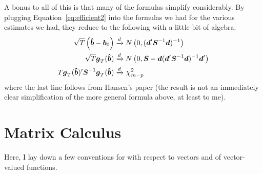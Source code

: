 \documentclass[12pt]{article}
\theoremstyle{plain}
\theoremstyle{definition}
\theoremstyle{remark}
\newcommand*{\Chi}{\mbox{\large$\chi$}} %
\begin{document}
A bonus to all of this is that many of the formulas simplify
considerably. By plugging Equation~\ref{eq:efficient2} into the formulas
we had for the various estimates we had, they reduce to the following
with a little bit of algebra:
\begin{align*}
  \sqrt{T}\left(\boldsymbol{\hat{b}}-\boldsymbol{b}_0\right)
  &\xrightarrow{d}
  N\left(0,
  (\boldsymbol{d}' \boldsymbol{S}^{-1} \boldsymbol{d})^{-1}
  \right)\\
  \sqrt{T}\boldsymbol{g}_T(\boldsymbol{\hat{b}})
  &\xrightarrow{d}
  N\left(
  0,
  \boldsymbol{S}
  -\boldsymbol{d}(\boldsymbol{d}' \boldsymbol{S}^{-1} \boldsymbol{d})^{-1}
  \boldsymbol{d}'
  \right)\\
  T
  \boldsymbol{g}_T(\boldsymbol{\hat{b}})'
  \boldsymbol{S}^{-1}
  \boldsymbol{g}_T(\boldsymbol{\hat{b}})
  &\xrightarrow{d} \Chi^2_{m-p}
\end{align*}
where the last line follows from Hansen's paper (the result is not an
immediately clear simplification of the more general formula above, at
least to me).



\clearpage
\appendix

\section{Matrix Calculus}

Here, I lay down a few conventions for with respect to vectors and of
vector-valued functions.
\end{document}
